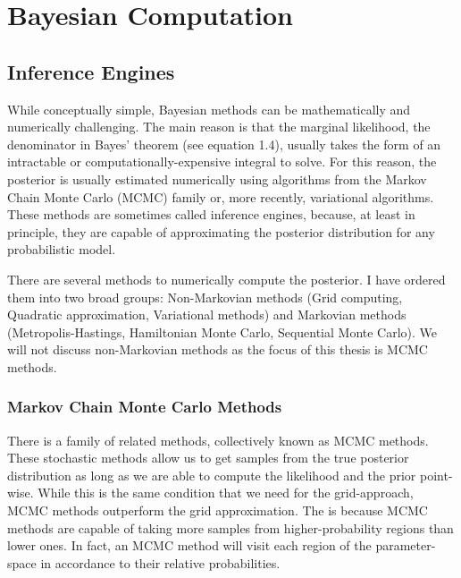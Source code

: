 \chapter{Bayesian Computation}\label{chap:infeng}


\section{Inference Engines}

While conceptually simple, Bayesian methods can be mathematically and numerically challenging. The main reason is that the marginal likelihood, the denominator in Bayes' theorem (see equation 1.4), usually takes the form of an intractable or computationally-expensive integral to solve. For this reason, the posterior is usually estimated numerically using algorithms from the Markov Chain Monte Carlo (MCMC) family or, more recently, variational algorithms. These methods are sometimes called inference engines, because, at least in principle, they are capable of approximating the posterior distribution for any probabilistic model. 

There are several methods to numerically compute the posterior. I have ordered them into two broad groups: Non-Markovian methods (Grid computing, Quadratic approximation, Variational methods) and Markovian methods (Metropolis-Hastings, Hamiltonian Monte Carlo, Sequential Monte Carlo). We will not discuss non-Markovian methods as the focus of this thesis is MCMC methods.

\subsection{Markov Chain Monte Carlo Methods}



There is a family of related methods, collectively known as MCMC methods. These stochastic methods allow us to get samples from the true posterior distribution as long as we are able to compute the likelihood and the prior point-wise. While this is the same condition that we need for the grid-approach, MCMC methods outperform the grid approximation. The is because MCMC methods are capable of taking more samples from higher-probability regions than lower ones. In fact, an MCMC method will visit each region of the parameter-space in accordance to their relative probabilities.

